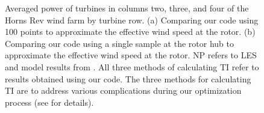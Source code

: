\documentclass[conf]{new-aiaa}
\begin{document}
\begin{figure}[htbp!]
	\centering
	\caption{Averaged power of turbines in columns two, three, and four of the Horns Rev wind farm by turbine row. (a) Comparing our code using 100 points to approximate the effective wind speed at the rotor. (b) Comparing our code using a single sample at the rotor hub to approximate the effective wind speed at the rotor. NP refers to LES and model results from \cite{niayifar2016}. All three methods of calculating TI refer to results obtained using our code. The three methods for calculating TI are to address various complications during our optimization process (see  for details).}
	\label{fig:power_line}
\end{figure}
\end{document}
